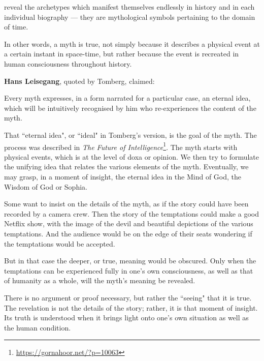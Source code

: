 \begin{quotex}
[myths] reveal the archetypes which manifest themselves endlessly in history and in each individual biography — they are mythological symbols pertaining to the domain of time. 

\end{quotex}
In other words, a myth is true, not simply because it describes a physical event at a certain instant in space-time, but rather because the event is recreated in human consciousness throughout history.

\textbf{Hans Leisegang}, quoted by Tomberg, claimed:

\begin{quotex}
Every myth expresses, in a form narrated for a particular case, an eternal idea, which will be intuitively recognised by him who re-experiences the content of the myth. 

\end{quotex}
That ``eternal idea", or ``ideal" in Tomberg's version, is the goal of the myth. The process was described in \textit{The Future of Intelligence}\footnote{\url{https://gornahoor.net/?p=10063}}. The myth starts with physical events, which is at the level of doxa or opinion. We then try to formulate the unifying idea that relates the various elements of the myth. Eventually, we may grasp, in a moment of insight, the eternal idea in the Mind of God, the Wisdom of God or Sophia.

Some want to insist on the details of the myth, as if the story could have been recorded by a camera crew. Then the story of the temptations could make a good Netflix show, with the image of the devil and beautiful depictions of the various temptations. And the audience would be on the edge of their seats wondering if the temptations would be accepted.

But in that case the deeper, or true, meaning would be obscured. Only when the temptations can be experienced fully in one's own consciousness, as well as that of humanity as a whole, will the myth's meaning be revealed.

There is no argument or proof necessary, but rather the ``seeing" that it is true. The revelation is not the details of the story; rather, it is that moment of insight. Its truth is understood when it brings light onto one's own situation as well as the human condition.



